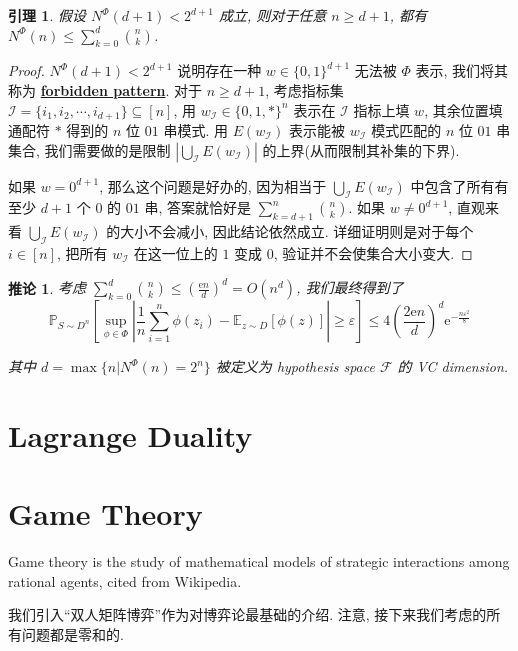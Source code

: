 \documentclass[8pt]{article}
\theoremstyle{compact}
\newtheorem{lemma}{引理}[section]
\newtheorem{corollary}{推论}[section]
\def\obj#1{\textbf{\uline{#1}}}
\def\le{\leqslant}
\def\ge{\geqslant}
\def\e{\mathrm{e}}
\begin{document}
\begin{lemma}
	假设 $N^{\Phi}(d + 1) < 2^{d+1}$ 成立, 则对于任意 $n \ge d + 1$, 都有 $N^{\Phi}(n) \le \sum\limits_{k=0}^{d}\binom nk$.
\end{lemma}
\begin{proof}
	$N^{\Phi}(d + 1) < 2^{d+1}$ 说明存在一种 $w \in \{0, 1\}^{d+1}$ 无法被 $\Phi$ 表示, 我们将其称为 \obj{forbidden pattern}. 对于 $n \ge d + 1$, 考虑指标集 $\mathcal I = \{i_1, i_2, \cdots, i_{d+1}\} \subseteq [n]$, 用 $w_{\mathcal I} \in \{0, 1, *\}^n$ 表示在 $\mathcal I$ 指标上填 $w$, 其余位置填通配符 $*$ 得到的 $n$ 位 $01$ 串模式. 用 $E(w_{\mathcal I})$ 表示能被 $w_{\mathcal I}$ 模式匹配的 $n$ 位 $01$ 串集合, 我们需要做的是限制 $\left|\bigcup_{\mathcal I}E(w_{\mathcal I})\right|$ 的上界(从而限制其补集的下界).

	如果 $w = 0^{d+1}$, 那么这个问题是好办的, 因为相当于 $\bigcup_{\mathcal I}E(w_{\mathcal I})$ 中包含了所有有至少 $d+1$ 个 $0$ 的 $01$ 串, 答案就恰好是 $\sum\limits_{k = d+1}^{n}\binom{n}{k}$. 如果 $w \neq 0^{d+1}$, 直观来看 $\bigcup_{\mathcal I}E(w_{\mathcal I})$ 的大小不会减小, 因此结论依然成立. 详细证明则是对于每个 $i \in [n]$, 把所有 $w_{\mathcal I}$ 在这一位上的 $1$ 变成 $0$, 验证并不会使集合大小变大.
\end{proof}
\begin{corollary}
	考虑 $\sum\limits_{k=0}^d \binom nk \le \left(\frac{\e n}{d}\right)^d = O(n^d)$, 我们最终得到了$$\mathbb P_{S \sim D^n}\left[\sup_{\phi \in \Phi}\left|\frac1n\sum_{i=1}^{n}\phi(z_i) - \mathbb E_{z \sim D}[\phi(z)]\right| \ge \varepsilon\right] \le 4\left(\frac{2\e n}{d}\right)^d\e^{-\frac{n\varepsilon^2}{8}}$$

	其中 $d = \max\{n | N^{\Phi}(n) = 2^n\}$ 被定义为 hypothesis space $\mathcal F$ 的 VC dimension.
\end{corollary}

\newpage
\section{Lagrange Duality}

\newpage
\section{Game Theory}

Game theory is the study of mathematical models of strategic interactions among rational agents, cited from Wikipedia.

我们引入“双人矩阵博弈”作为对博弈论最基础的介绍. 注意, 接下来我们考虑的所有问题都是零和的.
\end{document}
